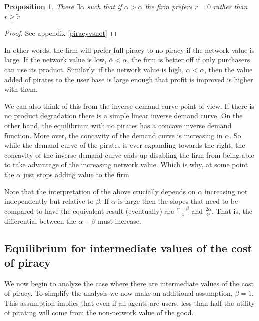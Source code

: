 \documentclass[12pt]{report}
\newtheorem{proposition}{Proposition}
\numberwithin{equation}{section}
\begin{document}
\begin{proposition}\label{piracyvsnotproposition}
There $ \exists \overline{\alpha} $ such that if $\alpha > \overline{\alpha}$ the firm prefers $r=0$ rather than $r \geq \tilde{r}$
\end{proposition}

\begin{proof}
See appendix \ref{piracyvsnot}
\end{proof}

In other words, the firm will prefer full piracy to no piracy if the network value is large. If the network value is low, $\overline{\alpha}<\alpha$, the firm is better off if only purchasers can use its product. Similarly, if the network value is high, $\overline{\alpha}<\alpha$, then the value added of pirates to the user base is large enough that profit is improved is higher with them. 

We can also think of this from the inverse demand curve point of view. If there is no product degradation there is a simple linear inverse demand curve. On the other hand, the equilibrium with no pirates has a concave inverse demand function. More over, the concavity of the demand curve is increasing in $\alpha$. So while the demand curve of the pirates is ever expanding towards the right, the concavity of the inverse demand curve ends up disabling the firm from being able to take advantage of the increasing network value. Which is why, at some point the $\alpha$ just stops adding value to the firm.

Note that the interpretation of the above crucially depends on $\alpha$ increasing not independently but relative to $\beta$. If $\alpha$ is large then the slopes that need to be compared to have the equivalent result (eventually) are $\frac{\alpha - \beta}{4}$ and $\frac{2 \alpha}{9}$. That is, the differential between the $\alpha-\beta$ must increase. 


\subsection{ Equilibrium for intermediate values of the cost of piracy}


We now begin to analyze the case where there are intermediate values of the cost of piracy. To simplify the analysis we now make an additional assumption, $\beta=1$. This assumption implies that even if all agents are users, less than half the utility of pirating will come from the non-network value of the good. 
\end{document}
